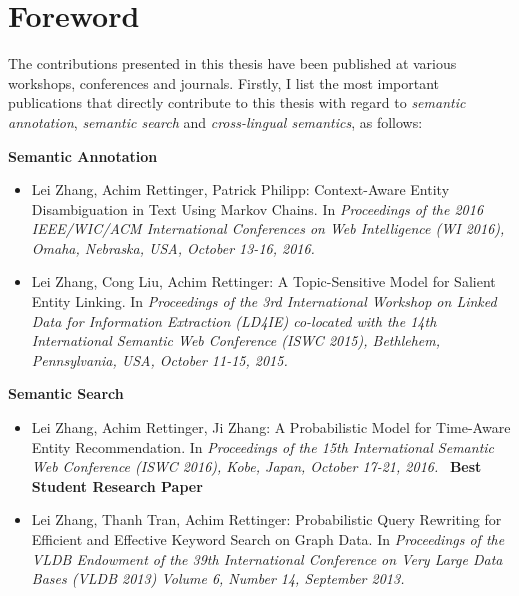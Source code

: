 \chapter{Foreword}

The contributions presented in this thesis have been published at various workshops, conferences and journals. Firstly, I list the most important publications that directly contribute to this thesis with regard to \emph{semantic annotation}, \emph{semantic search} and \emph{cross-lingual semantics}, as follows:

\forceindent\textbf{Semantic Annotation}
\begin{itemize}
    \item Lei Zhang, Achim Rettinger, Patrick Philipp: Context-Aware Entity Disambiguation in Text Using Markov Chains. In \emph{Proceedings of the 2016 IEEE/WIC/ACM International Conferences on Web Intelligence (WI 2016), Omaha, Nebraska, USA, October 13-16, 2016.}~\cite{wi2016}
    \item Lei Zhang, Cong Liu, Achim Rettinger: A Topic-Sensitive Model for Salient Entity Linking. In \emph{Proceedings of the 3rd International Workshop on Linked Data for Information Extraction (LD4IE) co-located with the 14th International Semantic Web Conference (ISWC 2015), Bethlehem, Pennsylvania, USA, October 11-15, 2015.}~\cite{DBLP:conf/semweb/ZhangLR15}
\end{itemize}

\forceindent\textbf{Semantic Search}
\begin{itemize}
    \item Lei Zhang, Achim Rettinger, Ji Zhang: A Probabilistic Model for Time-Aware Entity Recommendation. In \emph{Proceedings of the 15th International Semantic Web Conference (ISWC 2016), Kobe, Japan, October 17-21, 2016.}~\cite{DBLP:conf/semweb/ZhangRZ16a}
    \textbf{Best Student Research Paper}
    \item Lei Zhang, Thanh Tran, Achim Rettinger: Probabilistic Query Rewriting for Efficient and Effective Keyword Search on Graph Data. In \emph{Proceedings of the VLDB Endowment of the 39th International Conference on Very Large Data Bases (VLDB 2013) Volume 6, Number 14, September 2013.}~\cite{DBLP:journals/pvldb/0007TR13}
\end{itemize}

